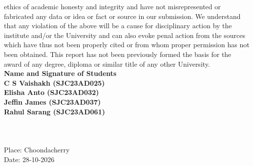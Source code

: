 ethics of academic honesty and integrity and have not misrepresented or fabricated any data or idea or
fact or source in our submission. We understand that any violation of the above will be a cause for
disciplinary action by the institute and/or the University and can also evoke penal action from the sources
which have thus not been properly cited or from whom proper permission has not been obtained. This
report has not been previously formed the basis for the award of any degree, diploma or similar title of
any other University.\vspace{1.3 cm}\\
{{\bf Name and Signature of Students}\vspace{0.5 cm}\\
{ \bf C S Vaishakh (SJC23AD025)}\\
   { \bf Elisha Anto (SJC23AD032)}\\
   { \bf Jeffin James (SJC23AD037)}\\
   { \bf Rahul Sarang (SJC23AD061)}}\\[-0.6mm] \\\\\\
\fi
Place: Choondacherry\\
Date: 28-10-2026


